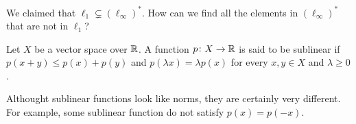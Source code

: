\documentclass[11pt,a4paper]{article}
\begin{document}
\begin{remark}
  We claimed that $\ell_1 \subsetneq (\ell_{\infty})^*$.
  How can we find all the elements in $(\ell_{\infty})^*$
  that are not in $\ell_1$?
\end{remark}

\begin{definition}
  Let $X$ be a vector space over $\mathbb{R}$.
  A function $p \colon X \to \mathbb{R}$ is said to be sublinear
  if $p(x + y) \le p(x) + p(y)$
  and $p(\lambda x) = \lambda p(x)$ for every $x,y \in X$
  and $\lambda \geq 0$.
\end{definition}
\begin{remark}
  Althought sublinear functions look like norms,
  they are certainly very different.
  For example, some sublinear function do not satisfy $p(x) = p(-x)$.
\end{remark}
\end{document}
